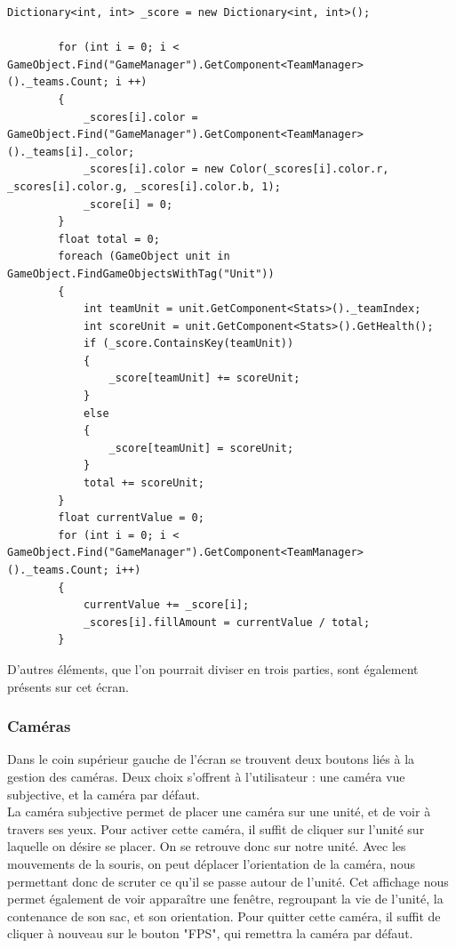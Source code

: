 \documentclass{report}
\begin{document}
\begin{lstlisting}[language={[Sharp]C},label={lst:Update()}, caption= Extrait du code de ScriptHUD.cs]
Dictionary<int, int> _score = new Dictionary<int, int>();
        
        for (int i = 0; i < GameObject.Find("GameManager").GetComponent<TeamManager>()._teams.Count; i ++)
        {
            _scores[i].color = GameObject.Find("GameManager").GetComponent<TeamManager>()._teams[i]._color;
            _scores[i].color = new Color(_scores[i].color.r, _scores[i].color.g, _scores[i].color.b, 1);
            _score[i] = 0;
        }
        float total = 0;
        foreach (GameObject unit in GameObject.FindGameObjectsWithTag("Unit"))
        {
            int teamUnit = unit.GetComponent<Stats>()._teamIndex;
            int scoreUnit = unit.GetComponent<Stats>().GetHealth();
            if (_score.ContainsKey(teamUnit))
            {
                _score[teamUnit] += scoreUnit;
            }
            else
            {
                _score[teamUnit] = scoreUnit;
            }
            total += scoreUnit;
        }
        float currentValue = 0;
        for (int i = 0; i < GameObject.Find("GameManager").GetComponent<TeamManager>()._teams.Count; i++)
        {
            currentValue += _score[i];
            _scores[i].fillAmount = currentValue / total;
        }
\end{lstlisting}	

D'autres éléments, que l'on pourrait diviser en trois parties, sont également présents sur cet écran.


\subsubsection{Caméras}
Dans le coin supérieur gauche de l'écran se trouvent deux boutons liés à la gestion des caméras.
Deux choix s'offrent à l'utilisateur : une caméra vue subjective, et la caméra par défaut.\\
La caméra subjective permet de placer une caméra sur une unité, et de voir à travers ses yeux. Pour activer cette caméra, il suffit de cliquer sur l'unité sur laquelle on désire se placer. On se retrouve donc sur notre unité. Avec les mouvements de la souris, on peut déplacer l'orientation de la caméra, nous permettant donc de scruter ce qu'il se passe autour de l'unité.
Cet affichage nous permet également de voir apparaître une fenêtre, regroupant la vie de l’unité, la contenance de son sac, et son orientation.
Pour quitter cette caméra, il suffit de cliquer à nouveau sur le bouton "FPS", qui remettra la caméra par défaut.
\end{document}
